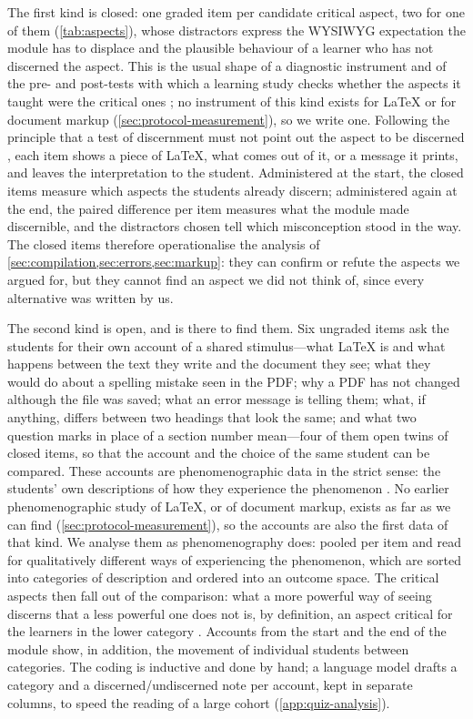 The first kind is closed: one graded item per candidate critical aspect,
two for one of them (\cref{tab:aspects}), whose distractors express the
WYSIWYG expectation the module has to displace and the plausible behaviour
of a learner who has not discerned the aspect.
This is the usual shape of a diagnostic instrument
\autocite{KaltakciGurel2015Diagnostics} and of the pre- and post-tests
with which a learning study checks whether the aspects it taught were the
critical ones \autocite[Ch.~7]{NCOL}; no instrument of this kind exists
for LaTeX or for document markup (\cref{sec:protocol-measurement}), so we
write one.
Following the principle that a test of discernment must not point out
the aspect to be discerned \autocite[p.~91]{NCOL}, each item shows a
piece of LaTeX, what comes out of it, or a message it prints, and leaves
the interpretation to the student.
Administered at the start, the closed items measure which aspects the
students already discern; administered again at the end, the paired
difference per item measures what the module made discernible, and the
distractors chosen tell which misconception stood in the way.
The closed items therefore operationalise the analysis of
\cref{sec:compilation,sec:errors,sec:markup}: they can confirm or refute
the aspects we argued for, but they cannot find an aspect we did not
think of, since every alternative was written by us.

The second kind is open, and is there to find them.
Six ungraded items ask the students for their own account of a shared
stimulus---what LaTeX is and what happens between the text they write and
the document they see; what they would do about a spelling mistake seen
in the PDF; why a PDF has not changed although the file was saved; what
an error message is telling them; what, if anything, differs between two
headings that look the same; and what two question marks in place of a
section number mean---four of them open twins of closed items, so that
the account and the choice of the same student can be compared.
These accounts are phenomenographic data in the strict sense: the
students' own descriptions of how they experience the phenomenon
\autocite{Phenomenography}.
No earlier phenomenographic study of LaTeX, or of document markup, exists
as far as we can find (\cref{sec:protocol-measurement}), so the accounts
are also the first data of that kind.
We analyse them as phenomenography does: pooled per item and read for
qualitatively different ways of experiencing the phenomenon, which are
sorted into categories of description and ordered into an outcome space.
The critical aspects then fall out of the comparison: what a more
powerful way of seeing discerns that a less powerful one does not is,
by definition, an aspect critical for the learners in the lower category
\autocite[Ch.~2]{NCOL}.
Accounts from the start and the end of the module show, in addition,
the movement of individual students between categories.
The coding is inductive and done by hand; a language model drafts a
category and a discerned/undiscerned note per account, kept in separate
columns, to speed the reading of a large cohort (\cref{app:quiz-analysis}).

